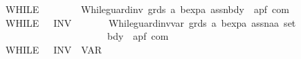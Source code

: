 \begin{isabellebody}
\ \ \ \ \ \ \ \ {\isacharparenleft}{\isachardoublequoteopen}{\isacharparenleft}{}WHILE\ {\isacharparenleft}{\isacharunderscore}{\isacharslash}{\isasymlongmapsto}\ {\isacharparenleft}{}{\isacharunderscore}{\isacharparenright}{\isacharparenright}\ {\isacharslash}{\isacharunderscore}{\isacharparenright}{\isachardoublequoteclose}\ \ {\isacharbrackleft}{}{}{}{}{\isacharcomma}{}{}{\isacharcomma}{}{}{\isacharbrackright}\ {}{}{\isacharparenright}\isanewline
\ \ {\isachardoublequoteopen}{\isacharunderscore}While{\isacharunderscore}guard{\isacharunderscore}inv{\isachardoublequoteclose}{\isacharcolon}{\isacharcolon}\ {\isachardoublequoteopen}grds\ {\isasymRightarrow}{\isacharprime}a\ bexp{\isasymRightarrow}{\isacharprime}a\ assn{\isasymRightarrow}bdy\ {\isasymRightarrow}\ {\isacharparenleft}{\isacharprime}a{\isacharcomma}{\isacharprime}p{\isacharcomma}{\isacharprime}f{\isacharparenright}\ com{\isachardoublequoteclose}\isanewline
\ \ \ \ \ \ \ \ {\isacharparenleft}{\isachardoublequoteopen}{\isacharparenleft}{}WHILE\ {\isacharparenleft}{\isacharunderscore}{\isacharslash}{\isasymlongmapsto}\ {\isacharparenleft}{}{\isacharunderscore}{\isacharparenright}{\isacharparenright}\ INV\ {\isacharparenleft}{\isacharunderscore}{\isacharparenright}\ {\isacharslash}{\isacharunderscore}{\isacharparenright}{\isachardoublequoteclose}\ \ {\isacharbrackleft}{}{}{}{}{\isacharcomma}{}{}{\isacharcomma}{}{\isacharcomma}{}{}{\isacharbrackright}\ {}{}{\isacharparenright}\isanewline
\ \ {\isachardoublequoteopen}{\isacharunderscore}While{\isacharunderscore}guard{\isacharunderscore}inv{\isacharunderscore}var{\isachardoublequoteclose}{\isacharcolon}{\isacharcolon}\ {\isachardoublequoteopen}grds\ {\isasymRightarrow}{\isacharprime}a\ bexp{\isasymRightarrow}{\isacharprime}a\ assn{\isasymRightarrow}{\isacharparenleft}{\isacharprime}a{\isasymtimes}{\isacharprime}a{\isacharparenright}\ set\isanewline
\ \ \ \ \ \ \ \ \ \ \ \ \ \ \ \ \ \ \ \ \ \ \ \ \ \ \ \ \ {\isasymRightarrow}bdy\ {\isasymRightarrow}\ {\isacharparenleft}{\isacharprime}a{\isacharcomma}{\isacharprime}p{\isacharcomma}{\isacharprime}f{\isacharparenright}\ com{\isachardoublequoteclose}\isanewline
\ \ \ \ \ \ \ \ {\isacharparenleft}{\isachardoublequoteopen}{\isacharparenleft}{}WHILE\ {\isacharparenleft}{\isacharunderscore}{\isacharslash}{\isasymlongmapsto}\ {\isacharparenleft}{}{\isacharunderscore}{\isacharparenright}{\isacharparenright}\ INV\ {\isacharparenleft}{\isacharunderscore}{\isacharparenright}{\isacharslash}\ VAR\ {\isacharparenleft}{\isacharunderscore}{\isacharparenright}\ {\isacharslash}{\isacharunderscore}{\isacharparenright}{\isachardoublequoteclose}\ \ {\isacharbrackleft}{}{}{}{}{\isacharcomma}{}{}{\isacharcomma}{}{\isacharcomma}{}{\isacharcomma}{}{}{\isacharbrackright}\ {}{}{\isacharparenright}\isanewline

\end{isabellebody}
